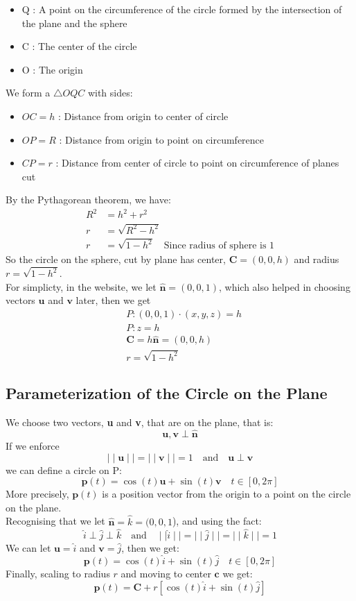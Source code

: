 \documentclass[11pt]{article}
\begin{document}
    \vspace{0pt}
\begin{itemize}
    \item Q : A point on the circumference of the circle formed by the intersection of the plane and the sphere
    \item C : The center of the circle
    \item O : The origin
\end{itemize}
We form a $\triangle OQC$ with sides:
\begin{itemize}
    \item $OC = h$ : Distance from origin to center of circle
    \item $OP = R$ : Distance from origin to point on circumference
    \item $CP = r$ : Distance from center of circle to point on circumference of planes cut
\end{itemize}
By the Pythagorean theorem, we have:
\begin{align*}
    R^2 & = h^2 + r^2                                               \\
    r   & = \sqrt{R^2 - h^2}                                        \\
    r   & = \sqrt{1 - h^2} \quad \text{Since radius of sphere is 1}
\end{align*}
So the circle on the sphere, cut by plane has center, $\mathbf{C} = (0,0,h)$ and radius $r = \sqrt{1 - h^2}$. \\
For simplicty, in the website, we let $\hat{\textbf{n}} = (0,0,1)$, which also helped in choosing vectors $\mathbf{u}$ and $\mathbf{v}$ later, then we get
\begin{align*}
     & P : (0,0,1) \cdot (x,y,z) = h    \\
     & P : z = h                        \\[1ex]
     & \mathbf{C} = h \hat{\textbf{n}} = (0,0,h) \\
     & r = \sqrt{1 - h^2}
\end{align*}
\subsection*{Parameterization of the Circle on the Plane}
We choose two vectors, \textbf{u} and \textbf{v}, that are on the plane, that is:
$$\mathbf{u}, \textbf{v} \perp \hat{\textbf{n}}$$
If we enforce $$\mid \mid \mathbf{u} \mid \mid = \mid \mid \textbf{v} \mid \mid = 1 \quad \text{and} \quad \mathbf{u} \perp \textbf{v}$$
we can define a circle on P:
$$\textbf{p}(t) = \cos(t) \mathbf{u} + \sin(t) \textbf{v} \quad t \in [0, 2\pi]$$
More precisely, $\textbf{p}(t)$ is a position vector from the origin to a point on the circle on the plane. \\
Recognising that we let $\hat{\textbf{n}} = \hat{k} = (0,0,1$), and using the fact:
$$\hat{i} \perp \hat{j} \perp \hat{k} \quad \text{and} \quad \mid \mid \hat{i} \mid \mid = \mid \mid \hat{j} \mid \mid = \mid \mid \hat{k} \mid \mid = 1$$
We can let $\textbf{u} = \hat{i}$ and $\textbf{v} = \hat{j}$, then we get:
$$\textbf{p}(t) = \cos(t) \hat{i} + \sin(t) \hat{j}\quad t \in [0, 2\pi]$$
Finally, scaling to radius $r$ and moving to center $\mathbf{c}$ we get:
$$\textbf{p}(t) = \mathbf{C} + r \left[\cos(t) \hat{i} + \sin(t) \hat{j}\right]$$
\end{document}

